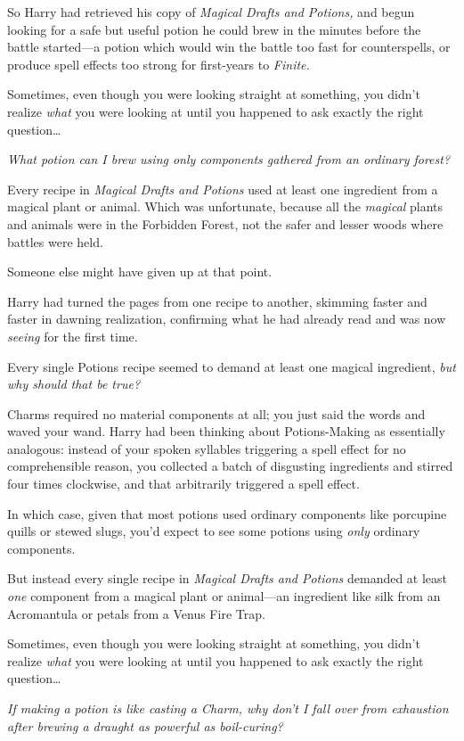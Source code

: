 So Harry had retrieved his copy of \emph{Magical Drafts and Potions,} and begun looking for a safe but useful potion he could brew in the minutes before the battle started—a potion which would win the battle too fast for counterspells, or produce spell effects too strong for first-years to \emph{Finite.}

Sometimes, even though you were looking straight at something, you didn’t realize \emph{what} you were looking at until you happened to ask exactly the right question…

\emph{What potion can I brew using only components gathered from an ordinary forest?}

Every recipe in \emph{Magical Drafts and Potions} used at least one ingredient from a magical plant or animal. Which was unfortunate, because all the \emph{magical} plants and animals were in the Forbidden Forest, not the safer and lesser woods where battles were held.

Someone else might have given up at that point.

Harry had turned the pages from one recipe to another, skimming faster and faster in dawning realization, confirming what he had already read and was now \emph{seeing} for the first time.

Every single Potions recipe seemed to demand at least one magical ingredient, \emph{but why should that be true?}

Charms required no material components at all; you just said the words and waved your wand. Harry had been thinking about Potions-Making as essentially analogous: instead of your spoken syllables triggering a spell effect for no comprehensible reason, you collected a batch of disgusting ingredients and stirred four times clockwise, and that arbitrarily triggered a spell effect.

In which case, given that most potions used ordinary components like porcupine quills or stewed slugs, you’d expect to see some potions using \emph{only} ordinary components.

But instead every single recipe in \emph{Magical Drafts and Potions} demanded at least \emph{one} component from a magical plant or animal—an ingredient like silk from an Acromantula or petals from a Venus Fire Trap.

Sometimes, even though you were looking straight at something, you didn’t realize \emph{what} you were looking at until you happened to ask exactly the right question…

\emph{If making a potion is like casting a Charm, why don’t I fall over from exhaustion after brewing a draught as powerful as boil-curing?}

